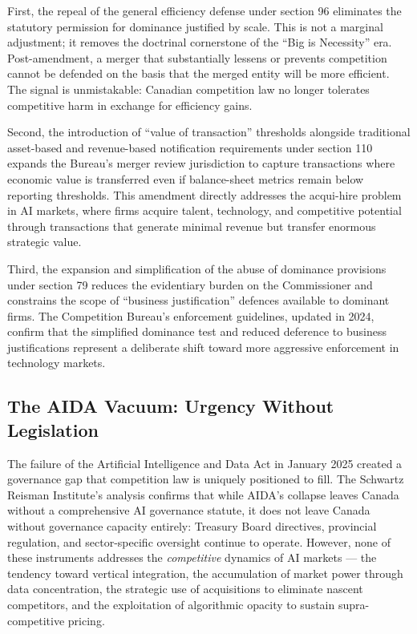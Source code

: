 First, the repeal of the general efficiency defense under section 96 eliminates the statutory permission for dominance justified by scale. This is not a marginal adjustment; it removes the doctrinal cornerstone of the ``Big is Necessity'' era. Post-amendment, a merger that substantially lessens or prevents competition cannot be defended on the basis that the merged entity will be more efficient. The signal is unmistakable: Canadian competition law no longer tolerates competitive harm in exchange for efficiency gains.

Second, the introduction of ``value of transaction'' thresholds alongside traditional asset-based and revenue-based notification requirements under section 110 expands the Bureau's merger review jurisdiction to capture transactions where economic value is transferred even if balance-sheet metrics remain below reporting thresholds. This amendment directly addresses the acqui-hire problem in AI markets, where firms acquire talent, technology, and competitive potential through transactions that generate minimal revenue but transfer enormous strategic value.

Third, the expansion and simplification of the abuse of dominance provisions under section 79 reduces the evidentiary burden on the Commissioner and constrains the scope of ``business justification'' defences available to dominant firms. The Competition Bureau's enforcement guidelines, updated in 2024, confirm that the simplified dominance test and reduced deference to business justifications represent a deliberate shift toward more aggressive enforcement in technology markets.

\subsection{The AIDA Vacuum: Urgency Without Legislation}

The failure of the Artificial Intelligence and Data Act in January 2025 created a governance gap that competition law is uniquely positioned to fill. The Schwartz Reisman Institute's analysis confirms that while AIDA's collapse leaves Canada without a comprehensive AI governance statute, it does not leave Canada without governance capacity entirely: Treasury Board directives, provincial regulation, and sector-specific oversight continue to operate. However, none of these instruments addresses the \textit{competitive} dynamics of AI markets --- the tendency toward vertical integration, the accumulation of market power through data concentration, the strategic use of acquisitions to eliminate nascent competitors, and the exploitation of algorithmic opacity to sustain supra-competitive pricing.

